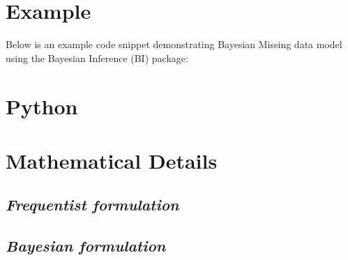 \documentclass[
  letterpaper,
  DIV=11,
  numbers=noendperiod]{scrreprt}
\newenvironment{Shaded}{\begin{snugshade}}{\end{snugshade}}
\begin{document}
\begin{tcolorbox}[enhanced jigsaw, toptitle=1mm, opacityback=0, titlerule=0mm, breakable, bottomrule=.15mm, colframe=quarto-callout-caution-color-frame, arc=.35mm, coltitle=black, left=2mm, opacitybacktitle=0.6, leftrule=.75mm, toprule=.15mm, rightrule=.15mm, bottomtitle=1mm, colbacktitle=quarto-callout-caution-color!10!white, title=\textcolor{quarto-callout-caution-color}{\faFire}\hspace{0.5em}{Caution}, colback=white]

\end{tcolorbox}

\section{Example}\label{example-15}

Below is an example code snippet demonstrating Bayesian Missing data
model using the Bayesian Inference (BI) package:

\section{Python}

\begin{Shaded}
\begin{Highlighting}[]

\end{Highlighting}
\end{Shaded}

\begin{Shaded}
\begin{Highlighting}[]

\end{Highlighting}
\end{Shaded}

\section{Mathematical Details}\label{mathematical-details-16}

\subsection{\texorpdfstring{\emph{Frequentist
formulation}}{Frequentist formulation}}\label{frequentist-formulation-9}

\subsection{\texorpdfstring{\emph{Bayesian
formulation}}{Bayesian formulation}}\label{bayesian-formulation-9}
\end{document}
